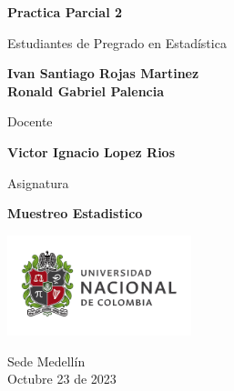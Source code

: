 \begin{titlepage}
   \Large{
   \begin{center}
       \vspace*{1cm}

       \textbf{Practica Parcial 2}
       
       \vspace{1.5cm}
        
      
       Estudiantes de Pregrado en Estadística
       
       \vspace{1cm}
         
       
       \textbf{Ivan Santiago Rojas Martinez} \\
       \textbf{Ronald Gabriel Palencia}
        
       \vspace{1cm}
       
      
       Docente
       
       \vspace{0.5cm}

       \textbf{Victor Ignacio Lopez Rios}
       
       \vspace{0.4cm}

       \vspace{1.5cm}
       
       Asignatura
       
       \vspace{0.5cm}

       \textbf{Muestreo Estadistico}

       \vfill

            
       \vspace{0.1cm}
     
       \includegraphics[width=0.4\textwidth]{DocumentFormat/logounal.png}
            
       Sede Medellín\\
       Octubre 23 de 2023
       
   \end{center}
   }
\end{titlepage}
